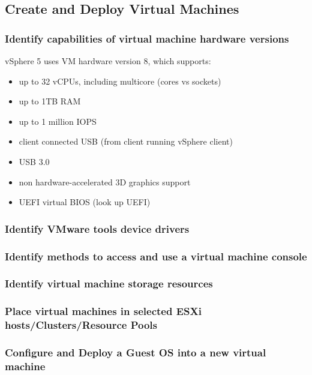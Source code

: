 \subsection{Create and Deploy Virtual Machines}

\subsubsection{Identify capabilities of virtual machine hardware versions}

vSphere 5 uses VM hardware version 8, which supports:

\begin{itemize}
\item up to 32 vCPUs, including multicore (cores vs sockets)
\item up to 1TB RAM
\item up to 1 million IOPS
\item client connected USB (from client running vSphere client)
\item USB 3.0
\item non hardware-accelerated 3D graphics support
\item UEFI virtual BIOS (look up UEFI)
\end{itemize}

\subsubsection{Identify VMware tools device drivers}

\subsubsection{Identify methods to access and use a virtual machine console}

\subsubsection{Identify virtual machine storage resources}

\subsubsection{Place virtual machines in selected ESXi hosts/Clusters/Resource Pools}

\subsubsection{Configure and Deploy a Guest OS into a new virtual machine}

